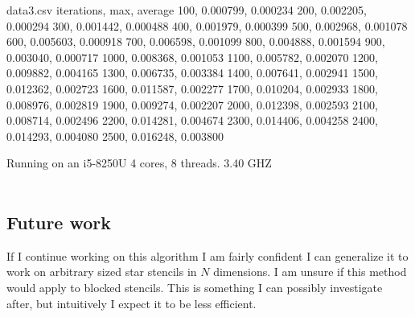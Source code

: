 \documentclass{article}
\begin{document}
\begin{filecontents*}{data3.csv}
	iterations, max, average
	100, 0.000799, 0.000234
	200, 0.002205, 0.000294
	300, 0.001442, 0.000488
	400, 0.001979, 0.000399
	500, 0.002968, 0.001078
	600, 0.005603, 0.000918
	700, 0.006598, 0.001099
	800, 0.004888, 0.001594
	900, 0.003040, 0.000717
	1000, 0.008368, 0.001053
	1100, 0.005782, 0.002070
	1200, 0.009882, 0.004165
	1300, 0.006735, 0.003384
	1400, 0.007641, 0.002941
	1500, 0.012362, 0.002723
	1600, 0.011587, 0.002277
	1700, 0.010204, 0.002933
	1800, 0.008976, 0.002819
	1900, 0.009274, 0.002207
	2000, 0.012398, 0.002593
	2100, 0.008714, 0.002496
	2200, 0.014281, 0.004674
	2300, 0.014406, 0.004258
	2400, 0.014293, 0.004080
	2500, 0.016248, 0.003800
\end{filecontents*}
Running on an i5-8250U 4 cores, 8 threads. 3.40 GHZ \\ \\
\pgfplotsset{scaled y ticks=false}

\subsection*{Future work}
If I continue working on this algorithm I am fairly confident I can generalize it to work on arbitrary sized star stencils in $N$ dimensions. 
I am unsure if this method would apply to blocked stencils. This is something I can possibly investigate after, but intuitively I expect it to be less efficient. 

 
\end{document}
